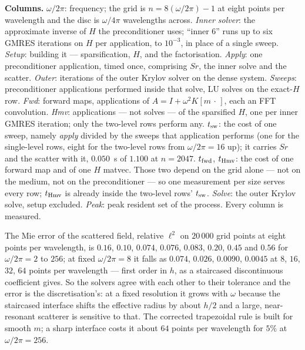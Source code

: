 \documentclass[11pt]{article}
\begin{document}
\begin{center}
\begin{minipage}{\textwidth}
\textbf{Columns.} $\omega/2\pi$: frequency; the grid is $n=8(\omega/2\pi)-1$ at eight
points per wavelength and the disc is $\omega/4\pi$ wavelengths across.
\emph{Inner solver}: the approximate inverse of $H$ the preconditioner uses; ``inner 6''
runs up to six GMRES iterations on $H$ per application, to $10^{-3}$, in place of a single
sweep. \emph{Setup}: building it --- sparsification, $H$, and the factorisation.
\emph{Apply}: one preconditioner application, timed once, comprising $Sr$, the inner solve
and the scatter. \emph{Outer}: iterations of the outer Krylov solver on the dense system.
\emph{Sweeps}: preconditioner applications performed inside that solve, LU solves on the
exact-$H$ row. \emph{Fwd}: forward maps, applications of $A=I+\omega^2K[m\,\cdot\,]$, each
an FFT convolution. \emph{Hmv}: applications --- not solves --- of the sparsified $H$, one
per inner GMRES iteration; only the two-level rows perform any.
$t_{\rm sw}$: the cost of one sweep, namely \emph{apply} divided by the sweeps that
application performs (one for the single-level rows, eight for the two-level rows from
$\omega/2\pi=16$ up); it carries $Sr$ and the scatter with it, $0.050$~s of $1.100$ at
$n=2047$. $t_{\rm fwd}$, $t_{\rm Hmv}$: the cost of one forward map and of one $H$ matvec.
Those two depend on the grid alone --- not on the medium, not on the preconditioner --- so
one measurement per size serves every row; $t_{\rm Hmv}$ is already inside the two-level
rows' $t_{\rm sw}$. \emph{Solve}: the outer Krylov solve, setup excluded. \emph{Peak}:
peak resident set of the process. Every column is measured.
\end{minipage}
\end{center}
The Mie error of the scattered field, relative $\ell^2$ on $20\,000$ grid points at eight
points per wavelength, is $0.16$, $0.10$, $0.074$, $0.076$, $0.083$, $0.20$, $0.45$ and
$0.56$ for $\omega/2\pi=2$ to $256$; at fixed $\omega/2\pi=8$ it falls as $0.074$,
$0.026$, $0.0090$, $0.0045$ at $8$, $16$, $32$, $64$ points per wavelength --- first order
in $h$, as a staircased discontinuous coefficient gives. So the solvers agree with each
other to their tolerance and the error is the discretisation's: at a fixed resolution it
grows with $\omega$ because the staircased interface shifts the effective radius by about
$h/2$ and a large, near-resonant scatterer is sensitive to that. The corrected
trapezoidal rule is built for smooth $m$; a sharp interface costs it about $64$ points
per wavelength for $5\%$ at $\omega/2\pi=256$.
\end{document}
